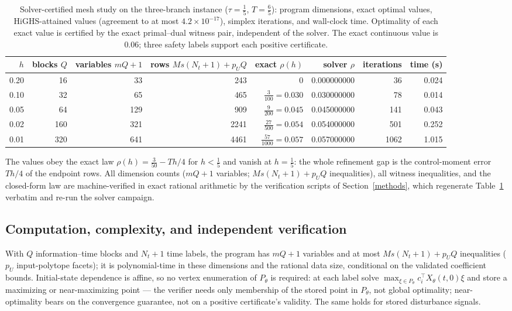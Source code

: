 \documentclass[10pt,twocolumn]{article}
\theoremstyle{plain}
\theoremstyle{definition}
\theoremstyle{remark}
\begin{document}
\begin{table}[t]
\centering
\footnotesize
\begin{tabular}{@{}r|r|r|r|r|r|r|r@{}}
\toprule
\(h\) & blocks \(Q\) & variables \(mQ{+}1\) & rows \(Ms(N_t{+}1)+p_UQ\) & exact \(\rho(h)\) & solver \(\rho\) & iterations & time (s) \\
\midrule
0.20 & 16 & 33  & 243  & \(0\) & 0.000000000 & 36   & 0.024 \\
0.10 & 32 & 65  & 465  & \(\tfrac{3}{100} = 0.030\) & 0.030000000 & 78   & 0.014 \\
0.05 & 64 & 129 & 909  & \(\tfrac{9}{200} = 0.045\) & 0.045000000 & 141  & 0.043 \\
0.02 & 160 & 321 & 2241 & \(\tfrac{27}{500} = 0.054\) & 0.054000000 & 501  & 0.252 \\
0.01 & 320 & 641 & 4461 & \(\tfrac{57}{1000} = 0.057\) & 0.057000000 & 1062 & 1.015 \\
\bottomrule
\end{tabular}
\caption{Solver-certified mesh study on the three-branch instance
(\(\tau = \tfrac15\), \(T = \tfrac65\)): program dimensions, exact optimal
values, HiGHS-attained values (agreement to at most \(4.2 \times 10^{-17}\)),
simplex iterations, and wall-clock time. Optimality of each exact value is
certified by the exact primal--dual witness pair, independent of the solver.
The exact continuous value is \(0.06\); three safety labels support each
positive certificate.}
\label{tab:mesh}
\end{table}

The values obey the exact law \(\rho(h) = \tfrac{3}{50} - Th/4\) for
\(h < \tfrac15\) and vanish at \(h = \tfrac15\): the whole refinement gap is
the control-moment error \(Th/4\) of the endpoint rows. All dimension counts
(\(mQ + 1\) variables; \(Ms(N_t{+}1) + p_U Q\) inequalities), all witness
inequalities, and the closed-form law are machine-verified in exact rational
arithmetic by the verification scripts of Section~\ref{methods}, which
regenerate Table~\ref{tab:mesh} verbatim and re-run the solver campaign.

\subsection{Computation, complexity, and independent verification}\label{computation}

With \(Q\) information--time blocks and \(N_t + 1\) time labels, the program
has \(mQ + 1\) variables and at most \(Ms(N_t{+}1) + p_U Q\) inequalities
(\(p_U\) input-polytope facets); it is polynomial-time in these dimensions
and the rational data size, conditional on the validated coefficient bounds.
Initial-state dependence is affine, so no vertex enumeration of \(P_\theta\)
is required: at each label solve
\(\max_{\xi \in P_\theta} c_i^\top X_\theta(t,0)\xi\) and store a maximizing
or near-maximizing point --- the verifier needs only membership of the stored
point in \(P_\theta\), not global optimality; near-optimality bears on the
convergence guarantee, not on a positive certificate's validity. The same
holds for stored disturbance signals.
\end{document}
